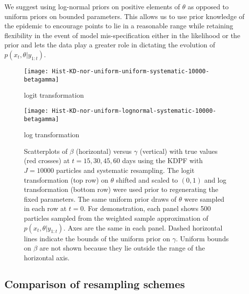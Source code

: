 \documentclass{elsarticle}
\begin{document}
We suggest using log-normal priors on positive elements of $\theta$ as opposed to uniform priors on bounded parameters. This allows us to use prior knowledge of the epidemic to encourage points to lie in a reasonable range while retaining flexibility in the event of model mis-specification either in the likelihood or the prior and lets the data play a greater role in dictating the evolution of $p(x_t,\theta|y_{1:t})$.

\begin{figure}

\begin{minipage}{1.0\linewidth}
\texttt{[image: Hist-KD-nor-uniform-uniform-systematic-10000-betagamma]}
\vspace{-1.0cm}
\caption*{logit transformation}
\end{minipage}

\vspace{0.5cm}

\begin{minipage}{1.0\linewidth}
\texttt{[image: Hist-KD-nor-uniform-lognormal-systematic-10000-betagamma]}
\vspace{-1.0cm}
\caption*{log transformation}
\end{minipage}

\caption{Scatterplots of $\beta$ (horizontal) versus $\gamma$ (vertical) with true values (red crosses) at $t = 15, 30, 45, 60$ days using the KDPF with $J = 10000$ particles and systematic resampling. The logit transformation (top row) on $\theta$ shifted and scaled to $(0,1)$ and log transformation (bottom row) were used prior to regenerating the fixed parameters. The same uniform prior draws of $\theta$ were sampled in each row at $t = 0$. For demonstration, each panel shows 500 particles sampled from the weighted sample approximation of $p(x_t,\theta|y_{1:t})$. Axes are the same in each panel. Dashed horizontal lines indicate the bounds of the uniform prior on $\gamma$. Uniform bounds on $\beta$ are not shown because they lie outside the range of the horizontal axis.} \label{fig:priors}

\end{figure}

\subsection{Comparison of resampling schemes \label{sec:resample}}
\end{document}
